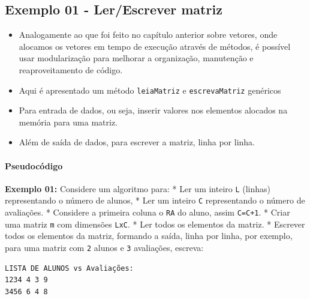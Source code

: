 \documentclass[12pt,a4paper]{article}
\begin{document}
    \hypertarget{exemplo-01---lerescrever-matriz}{%
\subsection{Exemplo 01 - Ler/Escrever
matriz}\label{exemplo-01---lerescrever-matriz}}

    \begin{itemize}
\item
  Analogamente ao que foi feito no capítulo anterior sobre vetores, onde
  alocamos os vetores em tempo de execução através de métodos, é
  possível usar modularização para melhorar a organização, manutenção e
  reaproveitamento de código.
\item
  Aqui é apresentado um método \texttt{leiaMatriz} e
  \texttt{escrevaMatriz} genéricos
\item
  Para entrada de dados, ou seja, inserir valores nos elementos alocados
  na memória para uma matriz.
\item
  Além de saída de dados, para escrever a matriz, linha por linha.
\end{itemize}

    \hypertarget{pseudocuxf3digo}{%
\paragraph{Pseudocódigo}\label{pseudocuxf3digo}}

    \textbf{Exemplo 01:} Considere um algoritmo para: * Ler um inteiro
\texttt{L} (linhas) representando o número de alunos, * Ler um inteiro
\texttt{C} representando o número de avaliações. * Considere a primeira
coluna o \texttt{RA} do aluno, assim \texttt{C=C+1}. * Criar uma matriz
\texttt{m} com dimensões \texttt{LxC}. * Ler todos os elementos da
matriz. * Escrever todos os elementos da matriz, formando a saída, linha
por linha, por exemplo, para uma matriz com \texttt{2} alunos e
\texttt{3} avaliações, escreva:

\begin{verbatim}
LISTA DE ALUNOS vs Avaliações:
1234 4 3 9
3456 6 4 8
\end{verbatim}
\end{document}
